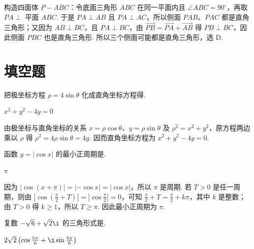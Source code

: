 \begin{solution}
构造四面体 \(P-ABC\)：令底面三角形 \(ABC\) 在同一平面内且 \(\angle ABC=90^{\circ}\)，再取 \(PA\perp\) 平面 \(ABC\). 于是 \(PA\perp AB\) 且 \(PA\perp AC\)，所以侧面 \(PAB\)、\(PAC\) 都是直角三角形；又因为 \(AB\perp BC\)，且 \(PA\perp BC\)，由 \(\overrightarrow{PB}=\overrightarrow{PA}+\overrightarrow{AB}\) 得 \(PB\perp BC\)，因此侧面 \(PBC\) 也是直角三角形. 所以三个侧面可能都是直角三角形，选 D.
\end{solution}

\section{填空题}

\begin{problem}
把极坐标方程 \(\rho = 4\sin \theta\) 化成直角坐标方程得\fillinblank{}.
\end{problem}

\begin{answer}
\(x^2 + y^2 - 4y = 0\)
\end{answer}

\begin{solution}
由极坐标与直角坐标的关系 \(x=\rho\cos\theta\)、\(y=\rho\sin\theta\) 及 \(\rho^2=x^2+y^2\)，原方程两边乘以 \(\rho\) 得 \(\rho^2=4\rho\sin\theta=4y\). 因而直角坐标方程为 \(x^2+y^2-4y=0\).
\end{solution}

\begin{problem}
函数 \(y = |\cos x|\) 的最小正周期是\fillinblank{}.
\end{problem}

\begin{answer}
\(\pi\)
\end{answer}

\begin{solution}
因为 \(|\cos(x+\pi)|=|{-\cos x}|=|\cos x|\)，所以 \(\pi\) 是周期. 若 \(T>0\) 是任一周期，则由 \(|\cos(\frac\pi2+T)|=|\cos\frac\pi2|=0\)，可知 \(\frac\pi2+T=\frac\pi2+k\pi\)，其中 \(k\) 是整数；由 \(T>0\) 得 \(k\geqslant1\)，所以 \(T\geqslant\pi\). 因此最小正周期为 \(\pi\).
\end{solution}

\begin{problem}
复数 \(-\sqrt{6} + \sqrt{2}\i\) 的三角形式是\fillinblank{}.
\end{problem}

\begin{answer}
\(2\sqrt{2}\left(\cos \frac{5\pi}{6} + \i \sin \frac{5\pi}{6}\right)\)
\end{answer}


